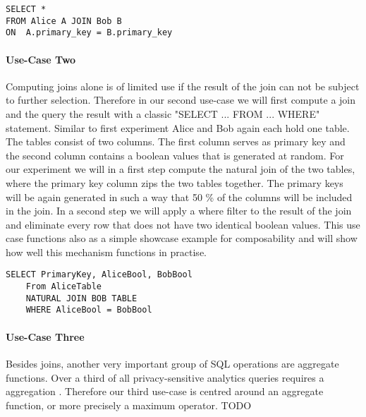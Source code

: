 \label{SQL1_label}				
\begin{lstlisting}[caption={ Functional equivalent SQL statement for our first use-case  }]
SELECT * 
FROM Alice A JOIN Bob B 
ON  A.primary_key = B.primary_key
\end{lstlisting}
\label{SQL1}
	\label{use-case two}		
\paragraph{Use-Case Two}
Computing joins alone is of limited use if the result of the join can not be subject to further selection. Therefore in our second use-case we will first compute a join and the query the result with a classic "SELECT ... FROM ... WHERE" statement. Similar to first experiment Alice and Bob again each hold one table. The tables consist of two columns. The first column serves as primary key and the second column contains a boolean values that is generated at random. For our experiment we will in a first step compute the natural join of the two tables, where the primary key column zips the two tables together. The primary keys will be again generated in such a way that 50 \% of the columns will be included in the join. In a second step we will apply a where filter to the result of the join and eliminate every row that does not have two identical boolean values. This use case functions also as a simple showcase example for composability and will show how well this mechanism functions in practise.    
\begin{lstlisting}[caption={Functional equivalent SQL statement for our second use-case}]
	SELECT PrimaryKey, AliceBool, BobBool
	From AliceTable 
	NATURAL JOIN BOB TABLE
	WHERE AliceBool = BobBool
\end{lstlisting}
\paragraph{Use-Case Three}
Besides joins, another very important group of SQL operations are aggregate functions. Over a third of all privacy-sensitive analytics queries requires a aggregation \cite{johnson2017practical}. Therefore our third use-case is centred around an aggregate function, or more precisely a maximum operator.  TODO
 

